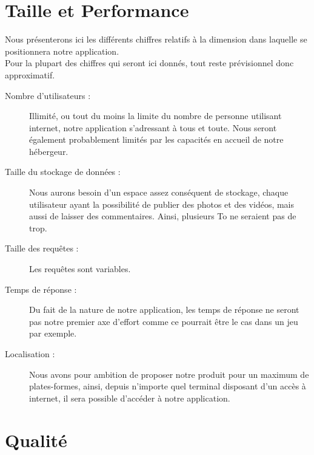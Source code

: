 \documentclass{life-fr}
\begin{document}

\chapter{Taille et Performance}

Nous présenterons ici les différents chiffres relatifs à la dimension dans laquelle se positionnera notre application.\\
Pour la plupart des chiffres qui seront ici donnés, tout reste prévisionnel donc approximatif.\\

\begin{description}
  \item[Nombre d’utilisateurs :]
    Illimité, ou tout du moins la limite du nombre de personne utilisant internet, notre application s’adressant à tous et toute. Nous seront également probablement limités par les capacités en accueil de notre hébergeur.
  \item[Taille du stockage de données :]
    Nous aurons besoin d’un espace assez conséquent de stockage, chaque utilisateur ayant la possibilité de publier des photos et des vidéos, mais aussi de laisser des commentaires. Ainsi, plusieurs To ne seraient pas de trop.
  \item[Taille des requêtes :]
    Les requêtes sont variables.
  \item[Temps de réponse :]
    Du fait de la nature de notre application, les temps de réponse ne seront pas notre premier axe d’effort comme ce pourrait être le cas dans un jeu par exemple.
  \item[Localisation :]
    Nous avons pour ambition de proposer notre produit pour un maximum de plates-formes, ainsi, depuis n’importe quel terminal disposant d’un accès à internet, il sera possible d’accéder à notre application.
\end{description}


\chapter{Qualité}
\end{document}
